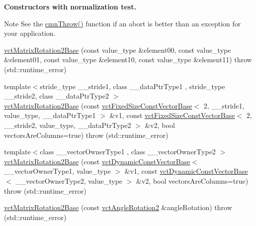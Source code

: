 \begin{Indent}{\bf Constructors with normalization test.}
{\begin{DoxyNote}{Note}
See the \hyperlink{_minimal_cmn_8h_ad50e82cf9c9dbd0e6443c13e0d1a6f1a}{cmn\+Throw()} function if an {\ttfamily abort} is better than an exception for your application. 
\end{DoxyNote}
}\begin{DoxyCompactItemize}
\item 
\hyperlink{classvct_matrix_rotation2_base_ada611c08e92cdb65e9497eca2cffbd47}{vct\+Matrix\+Rotation2\+Base} (const value\+\_\+type \&element00, const value\+\_\+type \&element01, const value\+\_\+type \&element10, const value\+\_\+type \&element11)  throw (std\+::runtime\+\_\+error)
\item 
{\footnotesize template$<$stride\+\_\+type \+\_\+\+\_\+stride1, class \+\_\+\+\_\+data\+Ptr\+Type1 , stride\+\_\+type \+\_\+\+\_\+stride2, class \+\_\+\+\_\+data\+Ptr\+Type2 $>$ }\\\hyperlink{classvct_matrix_rotation2_base_a76405410d06af1b84d1142c96f545002}{vct\+Matrix\+Rotation2\+Base} (const \hyperlink{classvct_fixed_size_const_vector_base}{vct\+Fixed\+Size\+Const\+Vector\+Base}$<$ 2, \+\_\+\+\_\+stride1, value\+\_\+type, \+\_\+\+\_\+data\+Ptr\+Type1 $>$ \&v1, const \hyperlink{classvct_fixed_size_const_vector_base}{vct\+Fixed\+Size\+Const\+Vector\+Base}$<$ 2, \+\_\+\+\_\+stride2, value\+\_\+type, \+\_\+\+\_\+data\+Ptr\+Type2 $>$ \&v2, bool vectors\+Are\+Columns=true)  throw (std\+::runtime\+\_\+error)
\item 
{\footnotesize template$<$class \+\_\+\+\_\+vector\+Owner\+Type1 , class \+\_\+\+\_\+vector\+Owner\+Type2 $>$ }\\\hyperlink{classvct_matrix_rotation2_base_aba308a285f57f40d7b50b7615334dd38}{vct\+Matrix\+Rotation2\+Base} (const \hyperlink{classvct_dynamic_const_vector_base}{vct\+Dynamic\+Const\+Vector\+Base}$<$ \+\_\+\+\_\+vector\+Owner\+Type1, value\+\_\+type $>$ \&v1, const \hyperlink{classvct_dynamic_const_vector_base}{vct\+Dynamic\+Const\+Vector\+Base}$<$ \+\_\+\+\_\+vector\+Owner\+Type2, value\+\_\+type $>$ \&v2, bool vectors\+Are\+Columns=true)  throw (std\+::runtime\+\_\+error)
\item 
\hyperlink{classvct_matrix_rotation2_base_a365284171b3f5482c4e261af52d4f650}{vct\+Matrix\+Rotation2\+Base} (const \hyperlink{classvct_angle_rotation2}{vct\+Angle\+Rotation2} \&angle\+Rotation)  throw (std\+::runtime\+\_\+error)
\end{DoxyCompactItemize}
\end{Indent}
